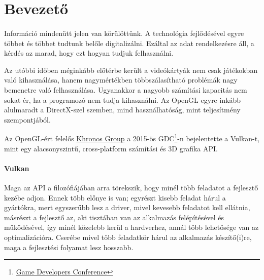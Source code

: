 
\section{Bevezet\H o}
\paragraph{} 
Inform\'aci\'o minden\"utt jelen van k\"or\"ul\"ott\"unk. A technol\'ogia fejl\H od\'es\'evel egyre t\"obbet \'es t\"obbet tudtunk bel\H ole digitaliz\'alni. Ez\'altal az adat rendelkez\'esre \'all, a k\'erd\'es az marad, hogy ezt hogyan tudjuk felhaszn\'alni.

Az ut\'obbi id\H oben m\'egink\'abb el\H ot\'erbe ker\"ult a vide\'ok\'arty\'ak nem csak j\'at\'ekokban val\'o kihaszn\'al\'asa, hanem nagym\'ert\'ekben t\"obbsz\'alas\'ithat\'o probl\'em\'ak nagy bemenetre val\'o felhaszn\'al\'asa. 
Ugyanakkor a nagyobb sz\'am\'it\'asi kapacit\'as nem sokat \'er, ha a programoz\'o nem tudja kihaszn\'alni. Az OpenGL egyre ink\'abb alulmaradt a DirectX-szel szemben, mind haszn\'alhat\'os\'ag, mint teljes\'itm\'eny szempontj\'ab\'ol.

Az OpenGL-\'ert felel\H os \href{https://www.khronos.org/}{Khronos Group} a 2015-\"os GDC\footnote{\href{http://www.gdconf.com/}{Game Developers Conference}}-n bejelentette a Vulkan-t, mint egy alacsonyszint\H u, cross-platform sz\'am\'it\'asi \'es 3D grafika API.

\paragraph{Vulkan}
Maga az API a filoz\'ofi\'aj\'aban arra t\"orekszik, hogy min\'el t\"obb feladatot a fejleszt\H o kez\'ebe adjon. Ennek t\"obb el\H onye is van; egyr\'eszt kisebb feladat h\'arul a gy\'art\'okra, mert egyszer\H ubb lesz a driver, mivel kevesebb feladatot kell ell\'atnia, m\'asr\'eszt a fejleszt\H o az, aki tiszt\'aban van az alkalmaz\'as fel\'ep\'it\'es\'evel \'es m\H uk\"od\'es\'evel, \'igy min\'el k\"ozelebb ker\"ul a hardverhez, ann\'al t\"obb lehet\H os\'ege van az optimaliz\'aci\'ora. \newline
Cser\'ebe mivel t\"obb feladatk\"or h\'arul az alkalmaz\'as k\'esz\'it\H o(i)re, maga a fejleszt\'esi folyamat lesz hosszabb.

